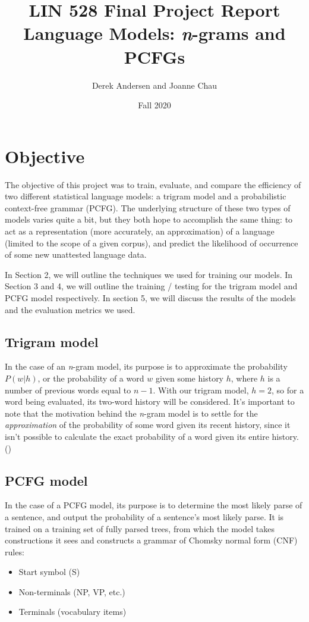 \documentclass{article}
\title{\textbf{LIN 528 Final Project Report}\\Language Models: \textit{n}-grams and PCFGs}
\author{Derek Andersen and Joanne Chau}
\date{Fall 2020}
\begin{document}
\maketitle

\section{Objective}

The objective of this project was to train, evaluate, and compare the efficiency of two different statistical language models: a trigram model and a probabilistic context-free grammar (PCFG). The underlying structure of these two types of models varies quite a bit, but they both hope to accomplish the same thing: to act as a representation (more accurately, an approximation) of a language (limited to the scope of a given corpus), and predict the likelihood of occurrence of some new unattested language data.  

In Section 2, we will outline the techniques we used for training our models. In Section 3 and 4, we will outline the training / testing for the trigram model and PCFG model respectively. In section 5, we will discuss the results of the models and the evaluation metrics we used.

\subsection{Trigram model}
In the case of an \textit{n}-gram model, its purpose is to approximate the probability $P(w|h)$, or the probability of a word $w$ given some history $h$, where $h$ is a number of previous words equal to $n-1$. With our trigram model, $h=2$, so for a word being evaluated, its two-word history will be considered. It's important to note that the motivation behind the \textit{n}-gram model is to settle for the \textit{approximation} of the probability of some word given its recent history, since it isn't possible to calculate the exact probability of a word given its entire history. (\cite{jurafskymartin})

\subsection{PCFG model}
In the case of a PCFG model, its purpose is to determine the most likely parse of a sentence, and output the probability of a sentence's most likely parse. It is trained on a training set of fully parsed trees, from which the model takes constructions it sees and constructs a grammar of Chomsky normal form (CNF) rules:
\begin{itemize}
    \item Start symbol (S)
    \item Non-terminals (NP, VP, etc.)
    \item Terminals (vocabulary items)
\end{itemize}
\end{document}
